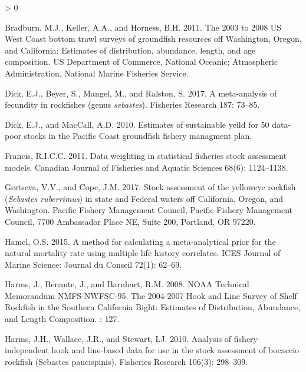 \documentclass[11pt,
  english,
  a4paper,
]{article}
\newlength{\cslhangindent}
\newenvironment{CSLReferences}[2] %
 {%
  \setlength{\parindent}{0pt}
  \ifodd #1 \everypar{\setlength{\hangindent}{\cslhangindent}}\ignorespaces\fi
  \ifnum #2 > 0
  \setlength{\parskip}{#2\baselineskip}
  \fi
 }%
 {}
\begin{document}
\leavevmode\tagmcend\tagstructend


\hypertarget{refs}{}
\begin{CSLReferences}{1}{0}
\leavevmode\hypertarget{ref-bradburn_2003_2011}{}%
Bradburn, M.J., Keller, A.A., and Horness, B.H. 2011. The 2003 to 2008 {US} {West} {Coast} bottom trawl surveys of groundfish resources off {Washington}, {Oregon}, and {California}: Estimates of distribution, abundance, length, and age composition. US Department of Commerce, National Oceanic; Atmospheric Administration, National Marine Fisheries Service.

\leavevmode\hypertarget{ref-dick_meta-analysis_2017}{}%
Dick, E.J., Beyer, S., Mangel, M., and Ralston, S. 2017. A meta-analysis of fecundity in rockfishes (genus \emph{sebastes}). Fisheries Research 187: 73--85.

\leavevmode\hypertarget{ref-dick_estimates_2010}{}%
Dick, E.J., and MacCall, A.D. 2010. Estimates of sustainable yeild for 50 data-poor stocks in the {Pacific} {Coast} groundfish fishery managment plan.

\leavevmode\hypertarget{ref-francis_data_2011}{}%
Francis, R.I.C.C. 2011. Data weighting in statistical fisheries stock assessment models. Canadian Journal of Fisheries and Aquatic Sciences 68(6): 1124--1138.

\leavevmode\hypertarget{ref-gertseva_stock_2017}{}%
Gertseva, V.V., and Cope, J.M. 2017. Stock assessment of the yelloweye rockfish (\emph{{Sebastes} ruberrimus}) in state and {Federal} waters off {California}, {Oregon}, and {Washington}. Pacific Fishery Management Council, Pacific Fishery Management Council, 7700 Ambassador Place NE, Suite 200, Portland, OR 97220.

\leavevmode\hypertarget{ref-hamel_method_2015}{}%
Hamel, O.S. 2015. A method for calculating a meta-analytical prior for the natural mortality rate using multiple life history correlates. ICES Journal of Marine Science: Journal du Conseil 72(1): 62--69.

\leavevmode\hypertarget{ref-harms_noaa_2008}{}%
Harms, J., Benante, J., and Barnhart, R.M. 2008. {NOAA} {Technical} {Memorandum} {NMFS}-{NWFSC}-95. {The} 2004-2007 {Hook} and {Line} {Survey} of {Shelf} {Rockfish} in the {Southern} {California} {Bight}: {Estimates} of {Distribution}, {Abundance}, and {Length} {Composition}. : 127.

\leavevmode\hypertarget{ref-harms_analysis_2010}{}%
Harms, J.H., Wallace, J.R., and Stewart, I.J. 2010. Analysis of fishery-independent hook and line-based data for use in the stock assessment of bocaccio rockfish ({Sebastes} paucispinis). Fisheries Research 106(3): 298--309.


\end{CSLReferences}
\end{document}
